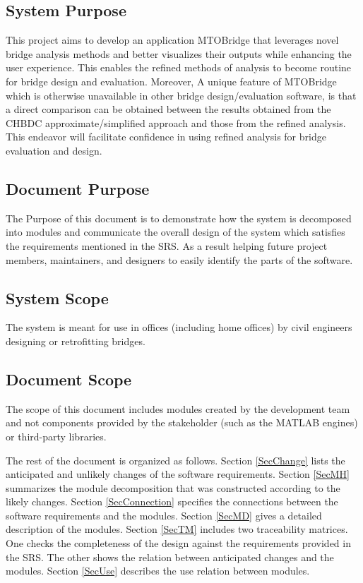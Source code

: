 \documentclass[12pt, titlepage]{article}
\begin{document}
\subsection{System Purpose}
This project aims to develop an application MTOBridge that leverages novel bridge analysis methods and better visualizes their outputs while enhancing the user experience.
This enables the refined methods of analysis to become routine for bridge design and evaluation. Moreover, A unique feature of MTOBridge which is otherwise unavailable in other
bridge design/evaluation software, is that a direct comparison can be obtained between the results obtained from the CHBDC approximate/simplified approach and those from the
refined analysis. This endeavor will facilitate confidence in using refined analysis for bridge evaluation and design.

\subsection{Document Purpose}
The Purpose of this document is to demonstrate how the system is decomposed into modules and communicate the overall design of the system which satisfies the requirements
 mentioned in the SRS. As a result helping future project members, maintainers, and designers to easily identify the parts of the software.

\subsection{System Scope}
The system is meant for use in offices (including home offices) by civil engineers designing or retrofitting bridges.

\subsection{Document Scope}
The scope of this document includes modules created by the development team and not components provided by the stakeholder (such as the MATLAB engines) 
or third-party libraries.

The rest of the document is organized as follows. Section
\ref{SecChange} lists the anticipated and unlikely changes of the software
requirements. Section \ref{SecMH} summarizes the module decomposition that
was constructed according to the likely changes. Section \ref{SecConnection}
specifies the connections between the software requirements and the
modules. Section \ref{SecMD} gives a detailed description of the
modules. Section \ref{SecTM} includes two traceability matrices. One checks
the completeness of the design against the requirements provided in the SRS. The
other shows the relation between anticipated changes and the modules. Section
\ref{SecUse} describes the use relation between modules.
\end{document}
